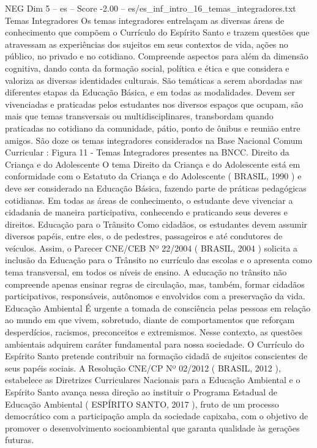\begin{textsample}{NEG Dim 5 – es – Score -2.00 – es/es\_inf\_intro\_16\_temas\_integradores.txt}  \label{ex:f5_neg_181}
Temas Integradores Os temas integradores entrelaçam as diversas áreas de conhecimento que compõem o Currículo do Espírito Santo e trazem questões que atravessam as experiências dos sujeitos em seus contextos de vida, ações no público, no privado e no cotidiano.
Compreende aspectos para além da dimensão cognitiva, dando conta da formação social, política e ética e que considera e valoriza as diversas identidades culturais.
São temáticas a serem abordadas nas diferentes etapas da Educação Básica, e em todas as modalidades.
Devem ser vivenciadas e praticadas pelos estudantes nos diversos espaços que ocupam, são mais que temas transversais ou multidisciplinares, transbordam quando praticadas no cotidiano da comunidade, pátio, ponto de ônibus e reunião entre amigos.
São doze os temas integradores considerados na Base Nacional Comum Curricular : Figura 11 - Temas Integradores presentes na BNCC.
Direito da Criança e do Adolescente O tema Direito da Criança e do Adolescente está em conformidade com o Estatuto da Criança e do Adolescente ( BRASIL, 1990 ) e deve ser considerado na Educação Básica, fazendo parte de práticas pedagógicas cotidianas.
Em todas as áreas de conhecimento, o estudante deve vivenciar a cidadania de maneira participativa, conhecendo e praticando seus deveres e direitos.
Educação para o Trânsito Como cidadãos, os estudantes devem assumir diversos papéis, entre eles, o de pedestres, passageiros e até condutores de veículos.
Assim, o Parecer CNE/CEB Nº 22/2004 ( BRASIL, 2004 ) solicita a inclusão da Educação para o Trânsito no currículo das escolas e o apresenta como tema transversal, em todos os níveis de ensino.
A educação no trânsito não compreende apenas ensinar regras de circulação, mas, também, formar cidadãos participativos, responsáveis, autônomos e envolvidos com a preservação da vida.
Educação Ambiental É urgente a tomada de consciência pelas pessoas em relação ao mundo em que vivem, sobretudo, diante de comportamentos que reforçam desperdícios, racismos, preconceitos e extremismos.
Nesse contexto, as questões ambientais adquirem caráter fundamental para nossa sociedade.
O Currículo do Espírito Santo pretende contribuir na formação cidadã de sujeitos conscientes de seus papéis sociais.
A Resolução CNE/CP Nº 02/2012 ( BRASIL, 2012 ), estabelece as Diretrizes Curriculares Nacionais para a Educação Ambiental e o Espírito Santo avança nessa direção ao instituir o Programa Estadual de Educação Ambiental ( ESPÍRITO SANTO, 2017 ), fruto de um processo democrático com a participação ampla da sociedade capixaba, com o objetivo de promover o desenvolvimento socioambiental que garanta qualidade às gerações futuras.

\end{textsample}
